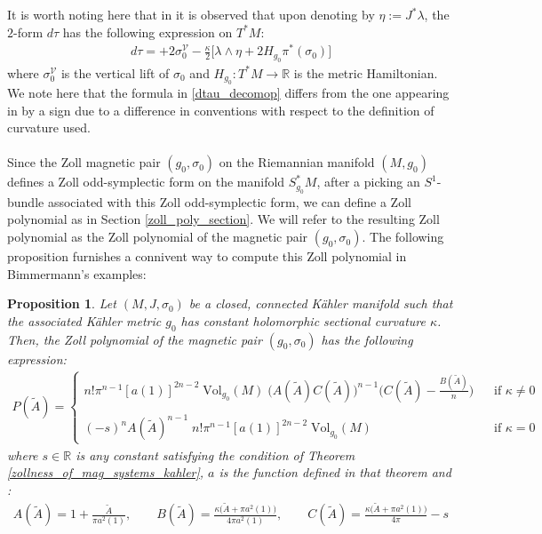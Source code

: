 \documentclass[11pt]{amsart}
\theoremstyle{plain}
\newtheorem{proposition}[theorem]{Proposition}
\theoremstyle{definition}
\theoremstyle{remark}
\begin{document}
It is worth noting here that in \cite[Proposition 2.5]{johanna_negative_curvature} it is observed that upon denoting by $\eta:= J^*\lambda$, the $2$-form $d\tau$ has the following expression on $T^*M$:
\begin{align}\label{dtau_decomop}
    d\tau = +2\sigma_{0}^{\mathcal{V}} - \frac{\kappa}{2}\Bigg[\lambda \wedge \eta +  2H_{g_0}\pi^*(\sigma_{0})\Bigg]
\end{align}
where $\sigma_{\text{0}}^{\mathcal{V}}$ is the vertical lift of $\sigma_{\text{0}}$ and $H_{g_0}: T^*M \rightarrow \mathbb{R}$ is the metric Hamiltonian. We note here that the formula in \eqref{dtau_decomop} differs from the one appearing in \cite{johanna_negative_curvature} by a sign due to a difference in conventions with respect to the definition of curvature used.\\
\\ 
Since the Zoll magnetic pair $(g_0,\sigma_0)$ on the Riemannian manifold $(M,g_0)$ defines a Zoll odd-symplectic form on the manifold $S_{g_0}^*M$, after a picking an $S^1$-bundle associated with this Zoll odd-symplectic form, we can define a Zoll polynomial as in Section \ref{zoll_poly_section}. We will refer to the resulting Zoll polynomial as the Zoll polynomial of the magnetic pair $(g_0,\sigma_0)$. The following proposition furnishes a connivent way to compute this Zoll polynomial in Bimmermann's examples: 
 \begin{proposition}\label{Zoll_poly_cpn_proposition}
Let $(M, J, \sigma_0)$ be a closed, connected K\"ahler manifold such that the associated K\"ahler metric $g_0$ has constant holomorphic sectional curvature $\kappa$. Then, the Zoll polynomial of the magnetic pair $(g_0,\sigma_0)$ has the following expression:
\begin{align}\label{cpn_Zoll_polynomial_final_form}
 P(\tilde A) = \begin{cases}
   n!\pi^{n-1}[a(1)]^{2n-2}
    \;\text{Vol}_{g_0}(M)\; \big(A(\tilde A)C(\tilde A)\big)^{n-1}\bigg(C(\tilde A) -\frac{B(\tilde A)}{n} \bigg) \;\;\;&\text{if $\kappa \neq 0$} 
    \\
    \\
       (-s)^n A(\tilde A)^{n-1}\; n!\pi^{n-1}[a(1)]^{2n-2}
    \;\text{Vol}_{g_0}(M)\;\;\; &\text{if $\kappa =0$}
 \end{cases}  
 \end{align}
 where $s \in \mathbb{R}$ is any constant satisfying the condition of Theorem \ref{zollness_of_mag_systems_kahler}, $a$ is the function defined in that theorem and :
 \begin{align}\label{def_of_K_tilde}
   A(\tilde A)=1+\frac{\tilde A}{\pi a^2(1)},\qquad
B(\tilde A)=\frac{\kappa\bigl(\tilde A+\pi a^2(1)\bigr)}{4\pi a^2(1)},\qquad
C(\tilde A)=\frac{\kappa\bigl(\tilde A+\pi a^2(1)\bigr)}{4\pi}-s
 \end{align}
\end{proposition}
\end{document}

